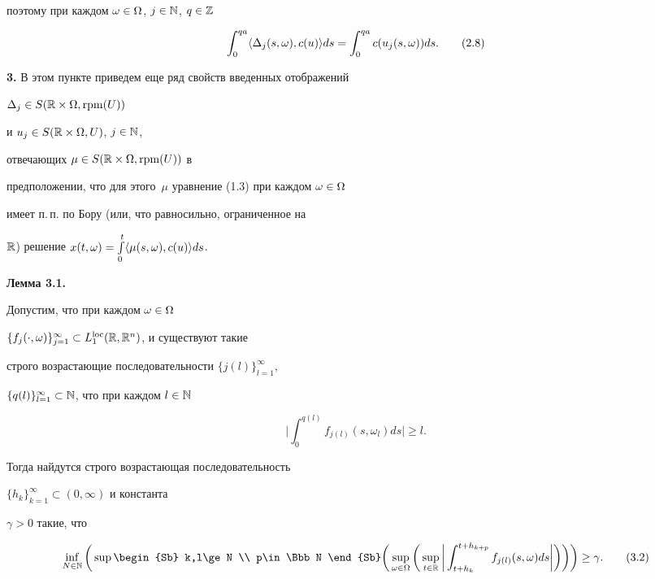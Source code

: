 поэтому при каждом $\omega\in\Omega$, $j\in \Bbb N$, $q\in \Bbb Z$


\begin{equation}


\int_0^{qa}\la\Delta_j(s,\omega),c(u)\ra ds=\int_0^{qa}


c(u_j(s,\omega))ds. \tag{2.8}


\end{equation}





{\bf 3.} В этом пункте приведем еще ряд свойств введенных отображений


$\Delta_j\in S(\Bbb R\times\Omega,\operatorname{rpm}(U))$


и $u_j \in S(\Bbb R\times\Omega,U)$, $j\in\Bbb N$,


отвечающих $\mu\in S(\Bbb R\times\Omega,\operatorname{rpm}(U))$ в


предположении, что для этого~$\mu$ уравнение (1.3) при каждом $\omega\in\Omega$


имеет п.\,п. по Бору (или, что равносильно, ограниченное на


$\Bbb R$) решение $x(t,\omega)=\int\limits_0^t\langle \mu(s,\omega),c(u)\rangle ds$.


\medskip





{\bf Лемма 3.1.} {\it


Допустим, что при каждом $\omega\in\Omega$\;


$\{f_j(\cdot,\omega)\}_{j=1}^{\infty}


\subset L_1^{\loc}(\Bbb R,\Bbb R^n)$, и существуют такие


строго возрастающие последовательности $\{j(l)\}_{l=1}^{\infty}$,


$\{q(l)\}_{l=1}^{\infty}\subset \Bbb N$, что при каждом $l\in\Bbb N$


\begin{equation}


\bigg|\int_0^{q(l)}f_{j(l)} (s,\omega_l) ds\bigg|\ge l. \tag{3.1}


\end{equation}


Тогда найдутся строго возрастающая последовательность


$\{h_k\}_{k=1}^{\infty}\subset (0,\infty)$ и константа


$\gamma >0$ такие, что}


\begin{equation}


\inf\limits_{N\in\Bbb N}\bigg( \sup\begin{Sb}


k,l\ge N \\ p\in \Bbb N \end{Sb}


\bigg(\sup\limits_{\omega\in\Omega}\bigg(\sup\limits_{t\in


\Bbb R}\bigg|\int_{t+h_k}^{t+h_{k+p}}f_{j(l)}(s,\omega)ds


\bigg|\bigg)\bigg)\bigg)\ge\gamma.


\tag{3.2}


\end{equation}





